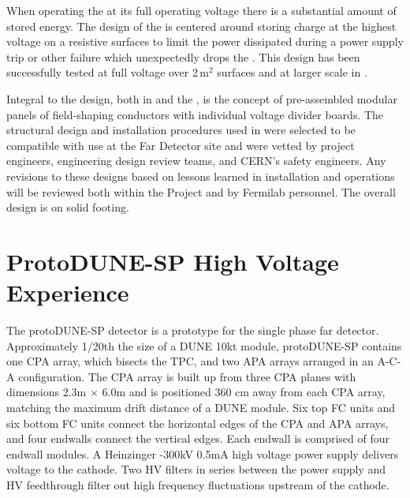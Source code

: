 When operating the  at its full operating voltage there is a substantial amount of stored energy. The design of the  is centered around storing charge  at the highest voltage on a resistive surfaces to limit the power dissipated during a power supply trip or other failure which unexpectedly drops the . This design has been successfully tested at full voltage over \num{2}\,m$^2$ surfaces and at larger scale in .  

Integral to the   design, both in  and the , is the concept of pre-assembled modular panels of field-shaping conductors with individual voltage divider boards. The structural design and installation procedures used in  were selected to be compatible with use at the Far Detector site and were vetted by project engineers, engineering design review teams, and CERN's safety engineers. Any revisions to these designs based on lessons learned in   installation and operations will be reviewed both within the Project and by Fermilab  personnel. The overall design is on solid footing. 

\section{ProtoDUNE-SP High Voltage Experience}
\label{sec:fdsp-hv-protodune}
The protoDUNE-SP detector \cite{protoDUNSP-tdr} is a prototype for the single phase \lartpc {} far detector.
Approximately 1/20th the size of a DUNE 10kt module, protoDUNE-SP contains one CPA array, which bisects the TPC, and two APA arrays arranged in an A-C-A configuration.
The CPA array is built up from three CPA planes with dimensions 2.3m $\times$ 6.0m and is positioned 360 cm away from each CPA array, matching the maximum drift distance of a DUNE module.
Six top FC units and six bottom FC units connect the horizontal edges of the CPA and APA arrays, and four endwalls connect the vertical edges.
Each endwall is comprised of four endwall modules.
A Heinzinger -300kV 0.5mA high voltage power supply delivers voltage to the cathode.
Two HV filters in series between the power supply and HV feedthrough filter out high frequency fluctuations upstream of the cathode.

